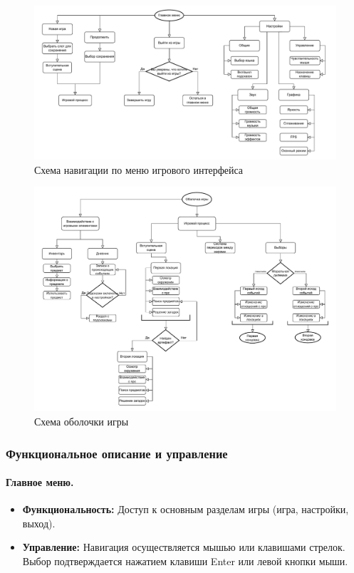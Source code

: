 \documentclass{article}
\begin{document}
	\newpage
	\begin{figure}[h!]
		\centering
		\includegraphics[width=\textwidth]{images/блоксхема1-2.pdf} 
		\caption{Схема навигации по меню игрового интерфейса}
		\label{fig:pdf-example}
	\end{figure}
	
	\begin{figure}[h!]
		\centering
		\includegraphics[width=\textwidth]{images/блоксхема2-3.pdf}
		\caption{Схема оболочки игры}
		\label{fig:pdf-example2}
	\end{figure}
	
	\newpage
	\subsubsection{Функциональное описание и управление}
	
	\paragraph{Главное меню.}
	\begin{itemize}
		\item \textbf{Функциональность:} Доступ к основным разделам игры (игра, настройки, выход).
		\item \textbf{Управление:} Навигация осуществляется мышью или клавишами стрелок. Выбор подтверждается нажатием клавиши Enter или левой кнопки мыши.
	\end{itemize}
	
\end{document}
